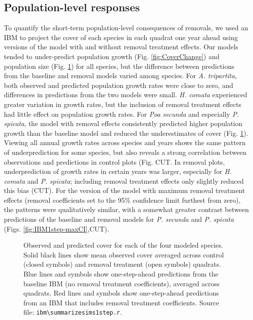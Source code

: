 \documentclass[11pt]{article}
\begin{document}
\begin{doublespacing}
\subsection*{Population-level responses}

To quantify the short-term population-level consequences of removals, we used an IBM to project the cover of each species in each quadrat one year ahead using versions of the model with and without removal treatment effects. Our models tended to under-predict population growth (Fig. \ref{fig:CoverChange}) and population size (Fig. \ref{fig:IBM1step}) for all species, but the difference between predictions from the baseline and removal models varied among species. For \textit{A. tripartita}, both observed and predicted population growth rates were close to zero, and differences in predictions from the two models were small. \textit{H. comata} experienced greater variation in growth rates, but the inclusion of removal treatment effects had little effect on population growth rates. For \textit{Poa secunda} and especially \textit{P. spicata}, the model with removal effects consistently predicted higher population growth than the baseline model  and reduced the underestimates of cover (Fig. \ref{fig:IBM1step}). Viewing all annual growth rates across species and years shows the same pattern of underprediction for some species, but also reveals a strong correlation between observations and predictions in control plots (Fig. CUT. In removal plots, underprediction of growth rates in certain years was larger, especially for \textit{H. comata} and \textit{P. spicata}; including removal treatment effects only slightly reduced this bias (CUT). For the version of the model with maximum removal treatment effects (removal coefficients set to the 95\% confidence limit furthest from zero), the patterns were qualitatively similar, with a somewhat greater contrast between predictions of the baseline and removal models for \textit{P. secunda} and \textit{P. spicata} (Figs. \ref{fig:IBM1step-maxCI},CUT).

 \begin{figure}[tbp]
 \centering
 \caption{Observed and predicted cover for each of the four modeled species. Solid black lines show mean observed cover averaged across control (closed symbols) and removal treatment (open symbols) quadrats. Blue lines and symbols show one-step-ahead predictions from the baseline IBM (no removal treatment coefficients), averaged across quadrats. Red lines and symbols show one-step-ahead predictions from an IBM that includes removal treatment coefficients. Source file: \texttt{ibm\textbackslash summarize\textunderscore sims1step.r}. }
 \label{fig:IBM1step}
 \end{figure}
 


\end{doublespacing}
\end{document}
